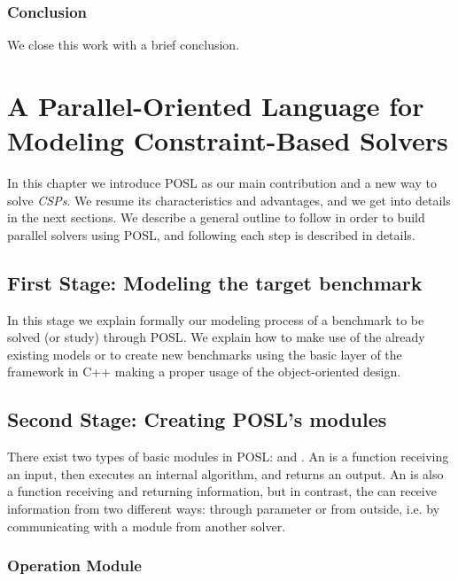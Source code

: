 \documentclass[a4paper]{book} %
\newcommand{\posl}{{\sc POSL}}
\newcommand{\csp}{\textit{CSP}}
\newcommand{\csps}{\csp\textit{s}}
\begin{document}
\subsection{Conclusion}

We close this work with a brief conclusion. 



\chapter{A Parallel-Oriented Language for Modeling Constraint-Based Solvers}

In this chapter we introduce \posl{} as our main contribution and a new way to solve \csps{}. We resume its characteristics and advantages, and we get into details in the next sections. We describe a general outline to follow in order to build parallel solvers using \posl, and following each step is described in details.

\section{First Stage: Modeling the target benchmark}

In this stage we explain formally our modeling process of a benchmark to be solved (or study) through \posl{}. We explain how to make use of the already existing models or to create new benchmarks using the basic layer of the framework in C++ making a proper usage of the object-oriented design.


\section{Second Stage: Creating \posl's modules}

There exist two types of basic modules in \posl: \oms{} and \opchs{}. An \om{} is a function receiving an input, then executes an internal algorithm, and returns an output. An \opch{} is also a function receiving and returning information, but in contrast, the \opch{} can receive information from two different ways: through parameter or from outside, i.e. by communicating with a module from another solver.

\subsection{Operation Module}
\end{document}

